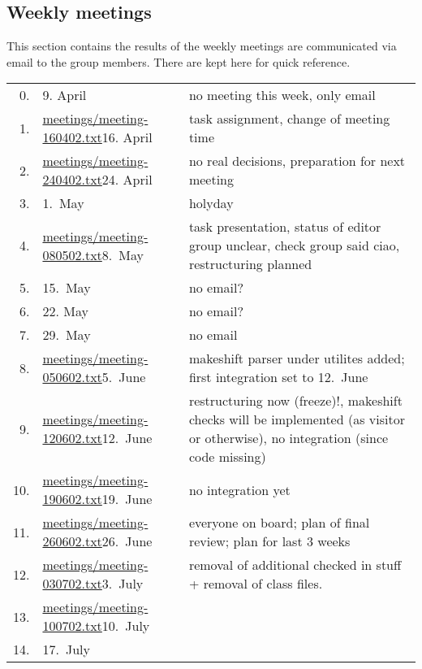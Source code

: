 

\subsection*{Weekly meetings}
\label{sec:meetings}


This section contains the results of the weekly meetings are communicated
via email to the group members. There are kept here for quick reference.


\begin{center}
  \begin{tabular}[t]{r@{\quad}l@{\quad\quad}p{9cm}}
    0.
    &
    9. April
    &
    no meeting this week, only email
    \\
    1.
    &
    \url{meetings/meeting-160402.txt}{16. April}
    &
    task assignment, change of meeting time
    \\
    2.
    & 
    \url{meetings/meeting-240402.txt}{24. April}
    &
    no real decisions, preparation for next meeting
    \\
    3.
    &
    1.\ May
    &
    holyday
    \\
    4.
    &
    \url{meetings/meeting-080502.txt}{8.\ May}
    & 
    task presentation, status of editor group unclear,
    check group said ciao, restructuring planned
    \\
    5.
    &
    15.\ May
    &
    no email?
    \\
    6.
    &
    22. May
    &
    no email?
    \\
    7.
    &
    29.\ May
    &
    no email
    \\
    8.
    &
    \url{meetings/meeting-050602.txt}{5.\ June}
    &
    makeshift parser under utilites added; first
    integration set to 12.\ June
    \\
    9.
    &
    \url{meetings/meeting-120602.txt}{12.\ June}
    &
    restructuring now (freeze)!, makeshift checks will be implemented 
    (as visitor or otherwise), no integration (since code
    missing)
    \\
    10. 
    &
    \url{meetings/meeting-190602.txt}{19.\ June}
    &
    no integration yet
    \\
    11. 
    &
    \url{meetings/meeting-260602.txt}{26.\ June}
    &
    everyone on board; plan of final review;
    plan for last 3 weeks
    \\
    12. 
    &
    \url{meetings/meeting-030702.txt}{3.\ July}
    &
    removal of additional checked in stuff +
    removal of class files.
    \\
    13. 
    &
    \url{meetings/meeting-100702.txt}{10.\ July}
    &
    \\
    14. 
    &
    17.\ July
    &
    \\
  \end{tabular}
\end{center}



